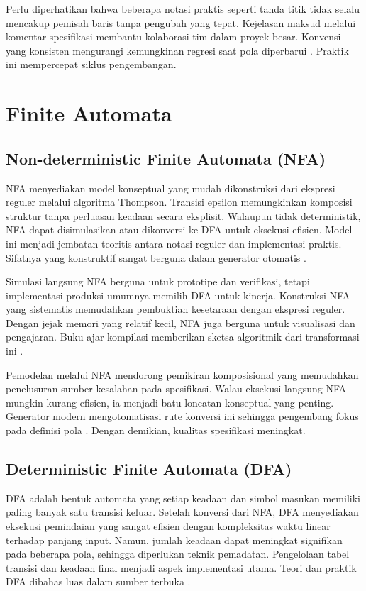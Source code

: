 \documentclass[../main.tex]{subfiles}
\begin{document}
Perlu diperhatikan bahwa beberapa notasi praktis seperti tanda titik tidak selalu mencakup pemisah baris tanpa pengubah yang tepat. Kejelasan maksud melalui komentar spesifikasi membantu kolaborasi tim dalam proyek besar. Konvensi yang konsisten mengurangi kemungkinan regresi saat pola diperbarui \citep{WikiRegex}. Praktik ini mempercepat siklus pengembangan.

\section{Finite Automata}
\subsection{Non-deterministic Finite Automata (NFA)}
NFA menyediakan model konseptual yang mudah dikonstruksi dari ekspresi reguler melalui algoritma Thompson. Transisi epsilon memungkinkan komposisi struktur tanpa perluasan keadaan secara eksplisit. Walaupun tidak deterministik, NFA dapat disimulasikan atau dikonversi ke DFA untuk eksekusi efisien. Model ini menjadi jembatan teoritis antara notasi reguler dan implementasi praktis. Sifatnya yang konstruktif sangat berguna dalam generator otomatis \citep{WikiNFA}.

Simulasi langsung NFA berguna untuk prototipe dan verifikasi, tetapi implementasi produksi umumnya memilih DFA untuk kinerja. Konstruksi NFA yang sistematis memudahkan pembuktian kesetaraan dengan ekspresi reguler. Dengan jejak memori yang relatif kecil, NFA juga berguna untuk visualisasi dan pengajaran. Buku ajar kompilasi memberikan sketsa algoritmik dari transformasi ini \citep{Mogensen2010}.

Pemodelan melalui NFA mendorong pemikiran komposisional yang memudahkan penelusuran sumber kesalahan pada spesifikasi. Walau eksekusi langsung NFA mungkin kurang efisien, ia menjadi batu loncatan konseptual yang penting. Generator modern mengotomatisasi rute konversi ini sehingga pengembang fokus pada definisi pola \citep{WikiNFA}. Dengan demikian, kualitas spesifikasi meningkat.

\subsection{Deterministic Finite Automata (DFA)}
DFA adalah bentuk automata yang setiap keadaan dan simbol masukan memiliki paling banyak satu transisi keluar. Setelah konversi dari NFA, DFA menyediakan eksekusi pemindaian yang sangat efisien dengan kompleksitas waktu linear terhadap panjang input. Namun, jumlah keadaan dapat meningkat signifikan pada beberapa pola, sehingga diperlukan teknik pemadatan. Pengelolaan tabel transisi dan keadaan final menjadi aspek implementasi utama. Teori dan praktik DFA dibahas luas dalam sumber terbuka \citep{WikiDFA}.
\end{document}
